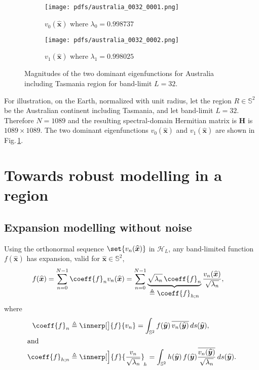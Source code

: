 \documentclass[10pt, twocolumn, twoside]{IEEEtran}
\newcommand{\untsph}{\mathbb{S}^{2}} %
\newcommand{\unit}[1]{\widehat{\bm{#1}}}
\newcommand{\dfn}{\triangleq}
\newcommand{\conj}[1]{\overline{#1}} %
\begin{document}
\begin{figure}[tb]
\centering
	\begin{subfigure}[t]{0.48\columnwidth}
	\centering
	\texttt{[image: pdfs/australia\_0032\_0001.png]}
	\caption{$v^{}_{0}(\unit{x})$ where $\lambda_{0}=0.998737$}
	\end{subfigure} \hfill
	\begin{subfigure}[t]{0.48\columnwidth}
	\centering
	\texttt{[image: pdfs/australia\_0032\_0002.png]}
	\caption{$v^{}_{1}(\unit{x})$ where $\lambda_{1}=0.998025$}
	\end{subfigure}
	\caption{Magnitudes of the two dominant eigenfunctions for Australia including Tasmania region for band-limit $L=32$.}\label{fig:region}
\end{figure}

For illustration, on the Earth, normalized with unit radius, let the region $R\in\untsph$ be the Australian continent including Tasmania, and let band-limit $L=32$.  Therefore $N=1089$ and the resulting spectral-domain Hermitian matrix is $\mathbf{H}$ is $1089\times1089$. The two dominant eigenfunctions $v^{}_{0}(\unit{x})$ and $v^{}_{1}(\unit{x})$ are shown in Fig.\,\ref{fig:region}.


\section{Towards robust modelling in a region}

\subsection{Expansion modelling without noise}

Using the orthonormal sequence $\set{v_n(\unit{x})}$ in $\mathcal{H}_L$, any band-limited function $f(\unit{x})$ has expansion, valid for $\unit{x}\in\untsph$,
\begin{align}
\label{eqn:g-sexpansion}
	f(\unit{x})
	=\sum_{n=0}^{N-1} \coeff{f}_n v_n(\unit{x})
	&=\sum_{n=0}^{N-1} \underbrace{\sqrt{\lambda_n}\,\coeff{f}_n}_{\displaystyle\dfn\coeff{f}_{h;n}}
	\frac{v_n(\unit{x})}{\sqrt{\lambda_n}}, %
\end{align}
where 
\begin{align*}
	\coeff{f}_n
	&\dfn\innerp[\big]{f}{v_n}
	=\int_{\untsph} f(\unit{y})\,\conj{v_n(\unit{y})}\,ds(\unit{y}),\\
	\shortintertext{and}
	\coeff{f}_{h;n}
	&\dfn\innerp[\Big]{f}{\frac{v_n}{\sqrt{\lambda_n}}}_{\!h}
	=\int_{\untsph}h(\unit{y})\,f(\unit{y})\frac{\conj{v_n(\unit{y})}}{\sqrt{\lambda_n}}\,ds(\unit{y}).
\end{align*}
\end{document}

